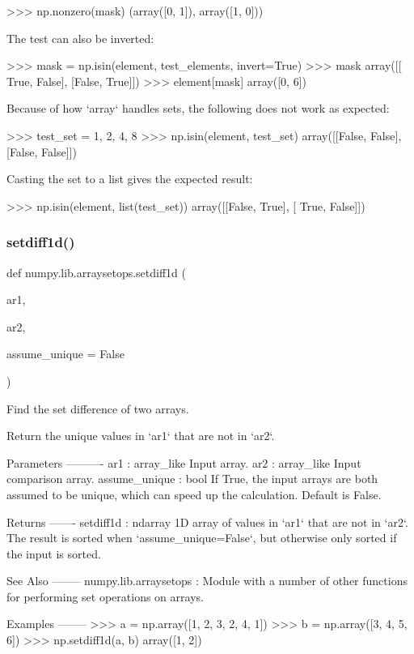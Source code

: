 \begin{DoxyVerb}
>>> np.nonzero(mask)
(array([0, 1]), array([1, 0]))

The test can also be inverted:

>>> mask = np.isin(element, test_elements, invert=True)
>>> mask
array([[ True, False],
       [False,  True]])
>>> element[mask]
array([0, 6])

Because of how `array` handles sets, the following does not
work as expected:

>>> test_set = {1, 2, 4, 8}
>>> np.isin(element, test_set)
array([[False, False],
       [False, False]])

Casting the set to a list gives the expected result:

>>> np.isin(element, list(test_set))
array([[False,  True],
       [ True, False]])
\end{DoxyVerb}
 \mbox{\label{namespacenumpy_1_1lib_1_1arraysetops_ad861ef8ca9321e4a02d8e0ba4d1d9cae}} 
\subsubsection{\texorpdfstring{setdiff1d()}{setdiff1d()}}
{\footnotesize\ttfamily def numpy.\+lib.\+arraysetops.\+setdiff1d (\begin{DoxyParamCaption}\item[{}]{ar1,  }\item[{}]{ar2,  }\item[{}]{assume\+\_\+unique = {\ttfamily False} }\end{DoxyParamCaption})}

\begin{DoxyVerb}Find the set difference of two arrays.

Return the unique values in `ar1` that are not in `ar2`.

Parameters
----------
ar1 : array_like
    Input array.
ar2 : array_like
    Input comparison array.
assume_unique : bool
    If True, the input arrays are both assumed to be unique, which
    can speed up the calculation.  Default is False.

Returns
-------
setdiff1d : ndarray
    1D array of values in `ar1` that are not in `ar2`. The result
    is sorted when `assume_unique=False`, but otherwise only sorted
    if the input is sorted.

See Also
--------
numpy.lib.arraysetops : Module with a number of other functions for
                        performing set operations on arrays.

Examples
--------
>>> a = np.array([1, 2, 3, 2, 4, 1])
>>> b = np.array([3, 4, 5, 6])
>>> np.setdiff1d(a, b)
array([1, 2])\end{DoxyVerb}
 \mbox{\label{namespacenumpy_1_1lib_1_1arraysetops_af8cf3b832fa490980a67a412e39005b6}} 
